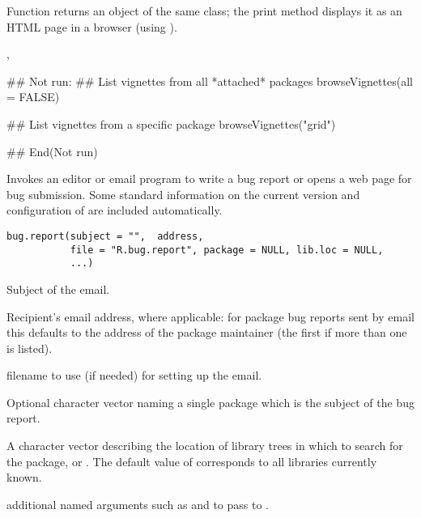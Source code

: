 %
\begin{Details}\relax
Function  returns an object of the same class;
the print method displays it as an HTML page in a browser (using
).
\end{Details}
%
\begin{SeeAlso}\relax
{}, 
\end{SeeAlso}
%
\begin{Examples}
\begin{ExampleCode}
## Not run: 
## List vignettes from all *attached* packages
browseVignettes(all = FALSE)

## List vignettes from a specific package
browseVignettes("grid")

## End(Not run)
\end{ExampleCode}
\end{Examples}
%
\begin{Description}\relax
Invokes an editor or email program to write a bug report or opens a
web page for bug submission.  Some standard information on the current
version and configuration of \R{} are included automatically.
\end{Description}
%
\begin{Usage}
\begin{verbatim}
bug.report(subject = "",  address,
           file = "R.bug.report", package = NULL, lib.loc = NULL,
           ...)
\end{verbatim}
\end{Usage}
%
\begin{Arguments}
\begin{ldescription}
\item[\code{subject}] Subject of the email.
\item[\code{address}] Recipient's email address, where applicable: for
package bug reports sent by email this defaults to the address of
the package maintainer (the first if more than one is listed).
\item[\code{file}] filename to use (if needed) for setting up the email.
\item[\code{package}] Optional character vector naming a single package which is 
the subject of the bug report.
\item[\code{lib.loc}] A character vector describing the location of \R{}
library trees in which to search for the package, or .
The default value of  corresponds to all libraries
currently known.
\item[\code{...}] additional named arguments such as  and
 to pass to .
\end{ldescription}
\end{Arguments}
